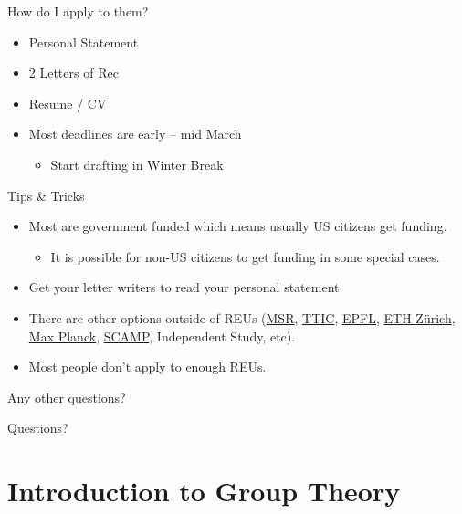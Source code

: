 \documentclass[aspectratio=169]{beamer}
\begin{document}
\begin{frame}{How do I apply to them?}
    \begin{itemize}
        \item Personal Statement \pause
        \item 2 Letters of Rec \pause
        \item Resume / CV \pause
        \item Most deadlines are early -- mid March
        \begin{itemize}
            \item Start drafting in Winter Break
        \end{itemize}
    \end{itemize}
\end{frame}

\begin{frame}{Tips \& Tricks}
    \begin{itemize}
        \item Most are government funded which means usually US citizens get funding.
        \begin{itemize}
            \item It is possible for non-US citizens to get funding in some special cases.
        \end{itemize} \pause
        \item Get your letter writers to read your personal statement.
        \item There are other options outside of REUs (\href{https://www.microsoft.com/en-us/research/}{MSR}, \href{https://www.ttic.edu/}{TTIC}, \href{https://summer.epfl.ch/}{EPFL}, \href{https://inf.ethz.ch/studies/summer-research-fellowship.html}{ETH Z{\"u}rich}, \href{https://www.cis.mpg.de/internships/}{Max Planck}, \href{https://idaccr.org/scamp}{SCAMP}, Independent Study, etc).
        \item Most people don't apply to enough REUs.
    \end{itemize} \pause
    \textcolor{sigma@alertred}{Any other questions?}
\end{frame}

\begin{frame}{}
      \begin{center}
    {\color{sigma@mainblue} \LARGE Questions?}
  \end{center}
\end{frame}

\section{Introduction to Group Theory}
\frame{\sectionpage}
\end{document}

